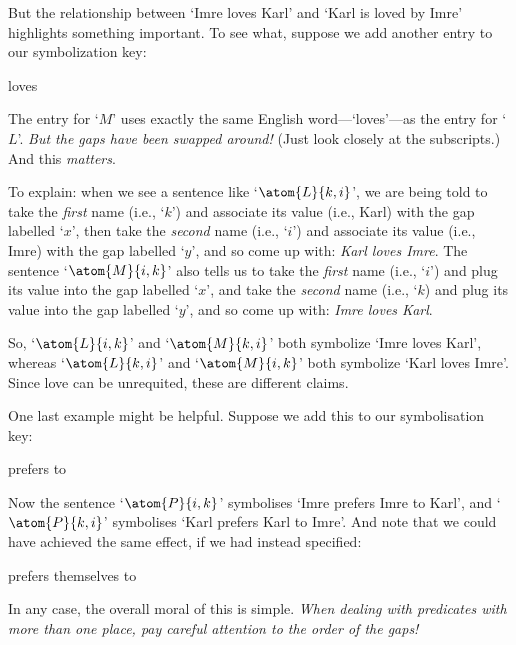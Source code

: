 But the relationship between `Imre loves Karl' and `Karl is loved by Imre' highlights something important. To see what, suppose we add another entry to our symbolization key:
\begin{ekey}
	\item[\atom{M}{x,y}]  loves 
\end{ekey}
The entry for `$M$' uses exactly the same English word---`loves'---as the entry for `$L$'. \emph{But the gaps have been swapped around!} (Just look closely at the subscripts.) And this \emph{matters}.

To explain: when we see a sentence like `$\atom{L}{k,i}$', we are being told to take the \emph{first} name (i.e., `$k$') and associate its value (i.e., Karl) with the gap labelled `$x$', then take the \emph{second} name (i.e., `$i$') and associate its value (i.e., Imre) with the gap labelled `$y$', and so come up with: \emph{Karl loves Imre}. The sentence `$\atom{M}{i,k}$' also tells us to take the \emph{first} name (i.e., `$i$') and plug its value into the gap labelled `$x$', and take the \emph{second} name (i.e., `$k$) and plug its value into the gap labelled `$y$', and so come up with: \emph{Imre loves Karl}.

So, `$\atom{L}{i,k}$' and `$\atom{M}{k,i}$' both symbolize `Imre loves Karl', whereas `$\atom{L}{k,i}$' and `$\atom{M}{i,k}$' both symbolize `Karl loves Imre'. Since love can be unrequited, these are different claims.

One last example might be helpful. Suppose we add this to our symbolisation key: 
\begin{ekey}
	\item[\atom{P}{x,y}]  prefers  to 
\end{ekey}
Now the sentence `$\atom{P}{i,k}$' symbolises `Imre prefers Imre to Karl', and `$\atom{P}{k,i}$' symbolises `Karl prefers Karl to Imre'.  And note that we could have achieved the same effect, if we had instead specified:
\begin{ekey}
	\item[\atom{P}{x,y}]  prefers themselves to 
\end{ekey}
In any case, the overall moral of this is simple. \emph{When dealing with predicates with more than one place, pay careful attention to the order of the gaps!} 



